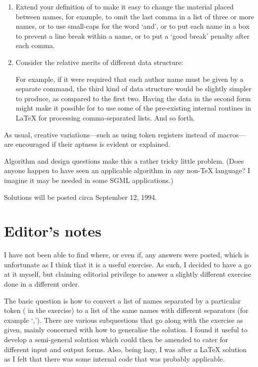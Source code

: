 \begin{enumerate}
\item Extend your definition of \cmd{\andlist} to make it easy to change 
      the material placed between names, for example, to omit the last 
      comma in a list of three or more names, or to use small-caps for 
      the word `and', or to put each name in a box to prevent a line 
      break within a name, or to put a `good break' penalty after each 
      comma.

\item Consider the relative merits of different data structure: 

    For example, if it were required that each author name must be 
given by a separate \cmd{\author} command, the third kind of data 
structure would be slightly simpler to produce, as compared to 
the first two. Having the data in the second form might make it 
possible for \cmd{\andlist} to use some of the pre-existing internal 
routines in LaTeX for processing comma-separated lists. And so forth.

\end{enumerate}


As usual, creative variations---such as using token registers 
instead of macros---are encouraged if their aptness is evident 
or explained. 


   Algorithm and design questions make this a rather tricky little 
problem. (Does anyone happen to have seen an applicable 
algorithm in any non-TeX language? I imagine it may be needed in 
some SGML applications.) 

Solutions will be posted circa September 12, 1994. 



\section{Editor's notes}

    I have not been able to find where, or even if, any answers were posted, 
which is unfortunate as I think that it is a useful exercise. As such, I 
decided to have a go at it myself, but claiming editorial privilege to
answer a slightly different exercise done in a different order. 

    The basic question is how to convert a list of names separated by a 
particular token (\cmd{\and} in the exercise) to a list of the same names
with different separators (for example `,'). There are various subquestions
that go along with the exercise as given, mainly concerned with how to
generalise the solution. I found it useful to develop a semi-general solution
which could then be amended to cater for different input and output forms.
Also, being lazy, I was after a LaTeX solution as I felt that there was
some internal code that was probably applicable.

